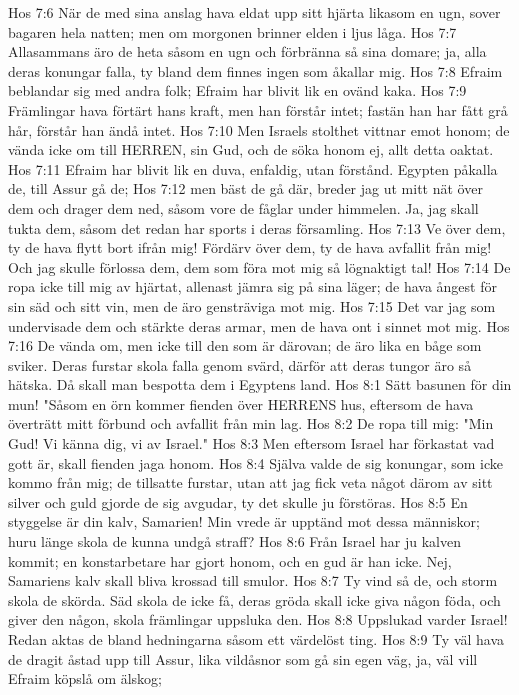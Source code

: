Hos 7:6  När de med sina anslag hava eldat upp sitt hjärta likasom en ugn, sover bagaren hela natten; men om morgonen brinner elden i ljus låga.
Hos 7:7  Allasammans äro de heta såsom en ugn och förbränna så sina domare; ja, alla deras konungar falla, ty bland dem finnes ingen som åkallar mig.
Hos 7:8  Efraim beblandar sig med andra folk; Efraim har blivit lik en ovänd kaka.
Hos 7:9  Främlingar hava förtärt hans kraft, men han förstår intet; fastän han har fått grå hår, förstår han ändå intet.
Hos 7:10  Men Israels stolthet vittnar emot honom; de vända icke om till HERREN, sin Gud, och de söka honom ej, allt detta oaktat.
Hos 7:11  Efraim har blivit lik en duva, enfaldig, utan förstånd. Egypten påkalla de, till Assur gå de;
Hos 7:12  men bäst de gå där, breder jag ut mitt nät över dem och drager dem ned, såsom vore de fåglar under himmelen. Ja, jag skall tukta dem, såsom det redan har sports i deras församling.
Hos 7:13  Ve över dem, ty de hava flytt bort ifrån mig! Fördärv över dem, ty de hava avfallit från mig! Och jag skulle förlossa dem, dem som föra mot mig så lögnaktigt tal!
Hos 7:14  De ropa icke till mig av hjärtat, allenast jämra sig på sina läger; de hava ångest för sin säd och sitt vin, men de äro gensträviga mot mig.
Hos 7:15  Det var jag som undervisade dem och stärkte deras armar, men de hava ont i sinnet mot mig.
Hos 7:16  De vända om, men icke till den som är därovan; de äro lika en båge som sviker. Deras furstar skola falla genom svärd, därför att deras tungor äro så hätska. Då skall man bespotta dem i Egyptens land.
Hos 8:1  Sätt basunen för din mun! "Såsom en örn kommer fienden över HERRENS hus, eftersom de hava överträtt mitt förbund och avfallit från min lag.
Hos 8:2  De ropa till mig: "Min Gud! Vi känna dig, vi av Israel."
Hos 8:3  Men eftersom Israel har förkastat vad gott är, skall fienden jaga honom.
Hos 8:4  Själva valde de sig konungar, som icke kommo från mig; de tillsatte furstar, utan att jag fick veta något därom av sitt silver och guld gjorde de sig avgudar, ty det skulle ju förstöras.
Hos 8:5  En styggelse är din kalv, Samarien! Min vrede är upptänd mot dessa människor; huru länge skola de kunna undgå straff?
Hos 8:6  Från Israel har ju kalven kommit; en konstarbetare har gjort honom, och en gud är han icke. Nej, Samariens kalv skall bliva krossad till smulor.
Hos 8:7  Ty vind så de, och storm skola de skörda. Säd skola de icke få, deras gröda skall icke giva någon föda, och giver den någon, skola främlingar uppsluka den.
Hos 8:8  Uppslukad varder Israel! Redan aktas de bland hedningarna såsom ett värdelöst ting.
Hos 8:9  Ty väl hava de dragit åstad upp till Assur, lika vildåsnor som gå sin egen väg, ja, väl vill Efraim köpslå om älskog;
